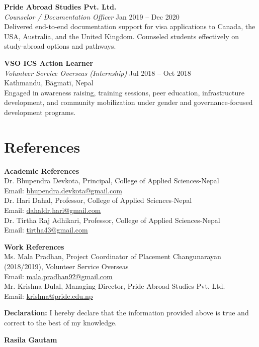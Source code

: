 \documentclass[a4paper,10pt]{article}
\begin{document}
\vspace{0.5em}
\textbf{Pride Abroad Studies Pvt. Ltd.} \\
\textit{Counselor / Documentation Officer} \hfill Jan 2019 -- Dec 2020 \\
Delivered end-to-end documentation support for visa applications to Canada, the USA, Australia, and the United Kingdom. Counseled students effectively on study-abroad options and pathways.

\vspace{0.5em}
\textbf{VSO ICS Action Learner} \\
\textit{Volunteer Service Overseas (Internship)} \hfill Jul 2018 -- Oct 2018 \\
Kathmandu, Bāgmatī, Nepal \\
Engaged in awareness raising, training sessions, peer education, infrastructure development, and community mobilization under gender and governance-focused development programs.


\section{References}
\textbf{Academic References}\\
Dr. Bhupendra Devkota, Principal, College of Applied Sciences-Nepal\\
Email: \href{mailto:bhupendra.devkota@gmail.com}{bhupendra.devkota@gmail.com}\\

Dr. Hari Dahal, Professor, College of Applied Sciences-Nepal\\
Email: \href{mailto:dahaldr.hari@gmail.com}{dahaldr.hari@gmail.com}\\

Dr. Tirtha Raj Adhikari, Professor, College of Applied Sciences-Nepal\\
Email: \href{mailto:tirtha43@gmail.com}{tirtha43@gmail.com}

\textbf{Work References}\\
Ms. Mala Pradhan, Project Coordinator of Placement Changunarayan (2018/2019), Volunteer Service Overseas\\
Email: \href{mailto:mala.pradhan92@gmail.com}{mala.pradhan92@gmail.com}\\

Mr. Krishna Dulal, Managing Director, Pride Abroad Studies Pvt. Ltd.\\
Email: \href{mailto:krishna@pride.edu.np}{krishna@pride.edu.np}


\vspace{1cm}
\textbf{Declaration:} I hereby declare that the information provided above is true and correct to the best of my knowledge.




\textbf{Rasila Gautam}\\
\end{document}
